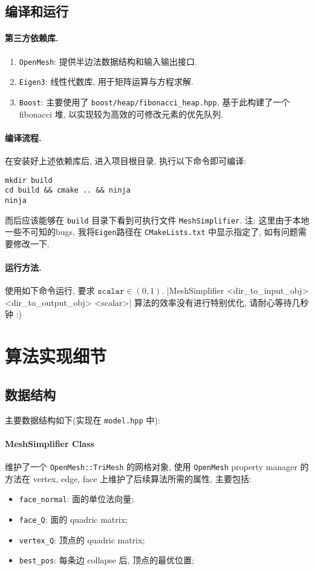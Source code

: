 \documentclass[11pt]{article}
\newcommand\1{\mathds{1}}
\begin{document}
\subsection{编译和运行}
\paragraph{第三方依赖库.} 
\begin{enumerate}
    \item \texttt{OpenMesh}: 提供半边法数据结构和输入输出接口.
    \item \texttt{Eigen3}: 线性代数库, 用于矩阵运算与方程求解.
    \item \texttt{Boost}: 主要使用了 \texttt{boost/heap/fibonacci\_heap.hpp}, 基于此构建了一个 fibonacci 堆, 以实现较为高效的可修改元素的优先队列.
\end{enumerate}
\paragraph{编译流程.} 在安装好上述依赖库后, 进入项目根目录, 执行以下命令即可编译:
\begin{verbatim}
mkdir build
cd build && cmake .. && ninja
ninja 
\end{verbatim}
而后应该能够在 \texttt{build} 目录下看到可执行文件 \texttt{MeshSimplifier}. 注: 这里由于本地一些不可知的bugs, 我将\texttt{Eigen}路径在 \texttt{CMakeLists.txt} 中显示指定了, 如有问题需要修改一下.
\paragraph{运行方法.} 使用如下命令运行, 要求 $\texttt{scalar} \in (0,1)$. 
|MeshSimplifier <dir_to_input_obj> <dir_to_output_obj> <scalar>|
算法的效率没有进行特别优化, 请耐心等待几秒钟 :)

\section{算法实现细节}
\subsection{数据结构}
主要数据结构如下(实现在 \texttt{model.hpp} 中): 
\paragraph{MeshSimplifier Class} 维护了一个 \texttt{OpenMesh::TriMesh} 的网格对象, 
使用 \texttt{OpenMesh} property manager 的方法在 vertex, edge, face 上维护了后续算法所需的属性, 主要包括:
\begin{itemize}
    \item \texttt{face\_normal}: 面的单位法向量;
    \item \texttt{face\_Q}: 面的 quadric matrix;
    \item \texttt{vertex\_Q}: 顶点的 quadric matrix;
    \item \texttt{best\_pos}: 每条边 collapse 后, 顶点的最优位置;
\end{itemize}
\end{document}
